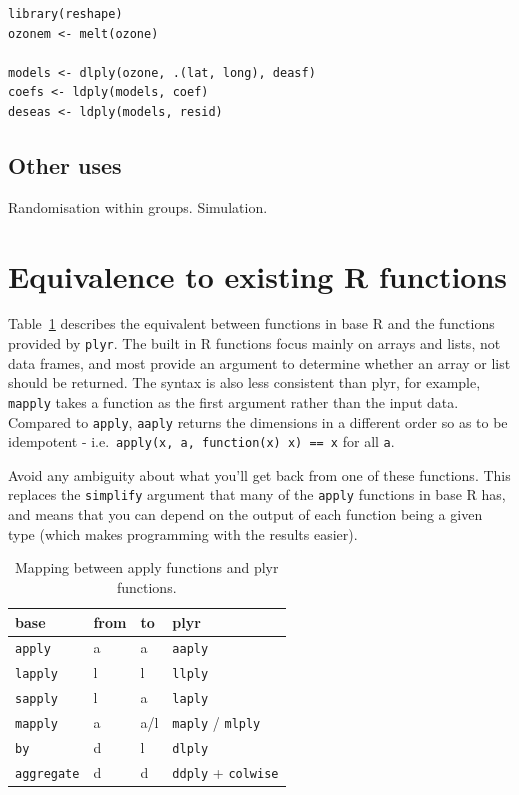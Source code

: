 \documentclass[letterpage]{scrartcl}
\newcommand{\code}[1]{\lstinline!#1!}
\begin{document}
\begin{verbatim}
library(reshape)
ozonem <- melt(ozone)

models <- dlply(ozone, .(lat, long), deasf)
coefs <- ldply(models, coef)
deseas <- ldply(models, resid)

\end{verbatim}

\subsection{Other uses}

Randomisation within groups.  Simulation.

\section{Equivalence to existing R functions}
\label{sec:equiv}

Table~\ref{tbl:equiv} describes the equivalent between functions in base R and 
the functions provided by {\tt plyr}.  The built in R functions focus mainly on arrays and lists, not data frames, and most provide an argument to determine whether an array or list should be returned.  The syntax is also less consistent than plyr, for example, {\tt mapply} takes a function as the first argument rather than the input data.  Compared to {\tt apply}, {\tt aaply} returns the dimensions in a different order so as to be idempotent - i.e.\ {\tt apply(x, a, function(x) x) == x} for all {\tt a}. 

Avoid any ambiguity about what you'll get back from one of these functions. This replaces the {\tt simplify} argument that many of the {\tt apply} functions in base R has, and means that you can depend on the output of each function being a given type (which makes programming with the results easier).


\begin{table}[htpb]
  \begin{center}
  \begin{tabular}{llll}
    \toprule
    base & from & to & plyr \\
    \midrule
    \code{apply }    & a & a   & \code{aaply} \\
    \code{lapply}    & l & l   & \code{llply} \\
    \code{sapply}    & l & a   & \code{laply} \\
    \code{mapply}    & a & a/l & \code{maply} / \code{mlply} \\
    \code{by}        & d & l   & \code{dlply} \\
    \code{aggregate} & d & d   & \code{ddply} + \code{colwise} \\
    \bottomrule
  \end{tabular}
  \end{center}
  \caption{Mapping between apply functions and plyr functions.}
  \label{tbl:equiv}
\end{table}
\end{document}
